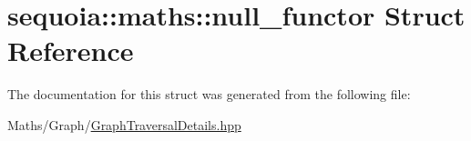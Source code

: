 \hypertarget{structsequoia_1_1maths_1_1null__functor}{}\section{sequoia\+::maths\+::null\+\_\+functor Struct Reference}
\label{structsequoia_1_1maths_1_1null__functor}


The documentation for this struct was generated from the following file\+:\begin{DoxyCompactItemize}
\item 
Maths/\+Graph/\mbox{\hyperlink{_graph_traversal_details_8hpp}{Graph\+Traversal\+Details.\+hpp}}\end{DoxyCompactItemize}
